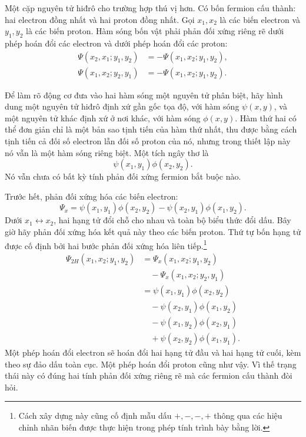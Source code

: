 Một cặp nguyên tử hiđrô cho trường hợp thú vị hơn. Có bốn fermion cấu thành: hai electron đồng nhất và hai proton đồng nhất. Gọi \(x_1,x_2\) là các biến electron và \(y_1,y_2\) là các biến proton. Hàm sóng bốn vật phải phản đối xứng riêng rẽ dưới phép hoán đổi các electron và dưới phép hoán đổi các proton:
\begin{align}
\Psi(x_2,x_1;y_1,y_2)
&=-\Psi(x_1,x_2;y_1,y_2),\\
\Psi(x_1,x_2;y_2,y_1)
&=-\Psi(x_1,x_2;y_1,y_2).
\end{align}

Để làm rõ động cơ đưa vào hai hàm sóng một nguyên tử phân biệt, hãy hình dung một nguyên tử hiđrô định xứ gần gốc tọa độ, với hàm sóng \(\psi(x,y)\), và một nguyên tử khác định xứ ở nơi khác, với hàm sóng \(\phi(x,y)\). Hàm thứ hai có thể đơn giản chỉ là một bản sao tịnh tiến của hàm thứ nhất, thu được bằng cách tịnh tiến cả đối số electron lẫn đối số proton của nó, nhưng trong thiết lập này nó vẫn là một hàm sóng riêng biệt. Một tích ngây thơ là
\begin{equation}
\psi(x_1,y_1)\phi(x_2,y_2).
\end{equation}
Nó vẫn chưa có bất kỳ tính phản đối xứng fermion bắt buộc nào.

Trước hết, phản đối xứng hóa các biến electron:
\begin{equation}
\Psi_x=
\psi(x_1,y_1)\phi(x_2,y_2)
-\psi(x_2,y_1)\phi(x_1,y_2).
\end{equation}
Dưới \(x_1\leftrightarrow x_2\), hai hạng tử đổi chỗ cho nhau và toàn bộ biểu thức đổi dấu. Bây giờ hãy phản đối xứng hóa kết quả này theo các biến proton. Thứ tự bốn hạng tử được cố định bởi hai bước phản đối xứng hóa liên tiếp.\footnote{Cách xây dựng này cũng cố định mẫu dấu \(+,-,-,+\) thông qua các hiệu chỉnh nhãn biến được thực hiện trong phép tính trình bày bằng lời.}
\begin{align}
\Psi_{2H}(x_1,x_2;y_1,y_2)
&=\Psi_x(x_1,x_2;y_1,y_2)\nonumber\\
&\quad{}-\Psi_x(x_1,x_2;y_2,y_1)\\
&=\psi(x_1,y_1)\phi(x_2,y_2)\nonumber\\
&\quad{}-\psi(x_2,y_1)\phi(x_1,y_2)\nonumber\\
&\quad{}-\psi(x_1,y_2)\phi(x_2,y_1)\nonumber\\
&\quad{}+\psi(x_2,y_2)\phi(x_1,y_1).
\label{eq:two-hydrogen-antisymmetrized}
\end{align}
Một phép hoán đổi electron sẽ hoán đổi hai hạng tử đầu và hai hạng tử cuối, kèm theo sự đảo dấu toàn cục. Một phép hoán đổi proton cũng như vậy. Vì thế trạng thái này có đúng hai tính phản đối xứng riêng rẽ mà các fermion cấu thành đòi hỏi.

